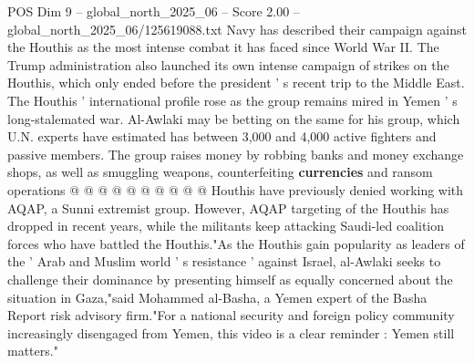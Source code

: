 \begin{textsample}{POS Dim 9 – global\_north\_2025\_06 – Score 2.00 – global\_north\_2025\_06/125619088.txt}
Navy has described their campaign against the Houthis as the most intense combat it has faced since World War II.
The Trump administration also launched its own intense campaign of strikes on the Houthis, which only ended before the president ' s recent trip to the Middle East.
The Houthis ' international profile rose as the group remains mired in Yemen ' s long-stalemated war.
Al-Awlaki may be betting on the same for his group, which U.N. experts have estimated has between 3,000 and 4,000 active fighters and passive members.
The group raises money by robbing banks and money exchange shops, as well as smuggling weapons, counterfeiting \textbf{currencies} and ransom operations @ @ @ @ @ @ @ @ @ @ Houthis have previously denied working with AQAP, a Sunni extremist group.
However, AQAP targeting of the Houthis has dropped in recent years, while the militants keep attacking Saudi-led coalition forces who have battled the Houthis."As the Houthis gain popularity as leaders of the ' Arab and Muslim world ' s resistance ' against Israel, al-Awlaki seeks to challenge their dominance by presenting himself as equally concerned about the situation in Gaza,"said Mohammed al-Basha, a Yemen expert of the Basha Report risk advisory firm."For a national security and foreign policy community increasingly disengaged from Yemen, this video is a clear reminder : Yemen still matters."

\end{textsample}
